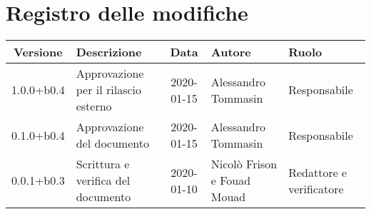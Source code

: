 \section*{Registro delle modifiche}

\begin{center}
	\begin{longtable}{|c|p{3.5cm}|c|p{3cm}|p{3cm}|}
	\hline
	\rowcolor{lighter-grayer}
	\textbf{Versione} & \textbf{Descrizione} & \textbf{Data} & \textbf{Autore} & \textbf{Ruolo} \\
	\hline
	\endfirsthead



	1.0.0+b0.4 & Approvazione per il rilascio esterno & 2020-01-15 & Alessandro Tommasin & Responsabile \\
	\hline
	0.1.0+b0.4 & Approvazione del documento & 2020-01-15 & Alessandro Tommasin & Responsabile \\
	\hline
	0.0.1+b0.3 & Scrittura e verifica del documento & 2020-01-10 & Nicolò Frison e Fouad Mouad & Redattore e verificatore \\
	\hline
	\end{longtable}
\end{center}